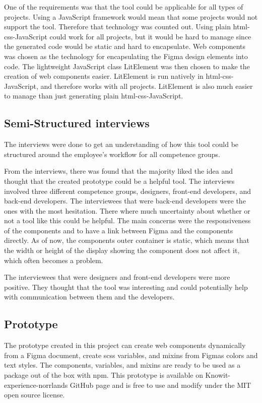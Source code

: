 One of the requirements was that the tool could be applicable for all types of projects. Using a JavaScript framework would mean that some projects would not support the tool. Therefore that technology was counted out. Using plain \acrshort{html}-\acrshort{css}-JavaScript could work for all projects, but it would be hard to manage since the generated code would be static and hard to encapsulate. Web \glspl{component} was chosen as the technology for encapsulating the Figma design elements into code. The lightweight JavaScript class LitElement was then chosen to make the creation of web components easier. LitElement is run natively in \acrshort{html}-\acrshort{css}-JavaScript, and therefore works with all projects. LitElement is also much easier to manage than just generating plain \acrshort{html}-\acrshort{css}-JavaScript.


\subsection{Semi-Structured interviews}%
\label{sub:Initial interviews}
The interviews were done to get an understanding of how this tool could be structured around the employee's workflow for all competence groups.

From the interviews, there was found that the majority liked the idea and thought that the created prototype could be a helpful tool.  The interviews involved three different competence groups, designers, front-end developers, and back-end developers. The interviewees that were back-end developers were the ones with the most hesitation. There where much uncertainty about whether or not a tool like this could be helpful. The main concerns were the responsiveness of the \glspl{component} and to have a link between Figma and the \glspl{component} directly. As of now, the \glspl{component} outer container is static, which means that the width or height of the display showing the \gls{component} does not affect it, which often becomes a problem.   

The interviewees that were designers and front-end developers were more positive. They thought that the tool was interesting and could potentially help with communication between them and the developers.

\subsection{Prototype}%
\label{sub:Prototype}
The prototype created in this project can create web components dynamically from a Figma document, create \acrshort{scss} variables, and \glspl{mixin} from Figmas colors and text styles. The components, variables, and \glspl{mixin} are ready to be used as a package out of the box with \acrshort{npm}. This prototype is available on Knowit-experience-norrlands GitHub page and is free to use and modify under the MIT open source license. 

